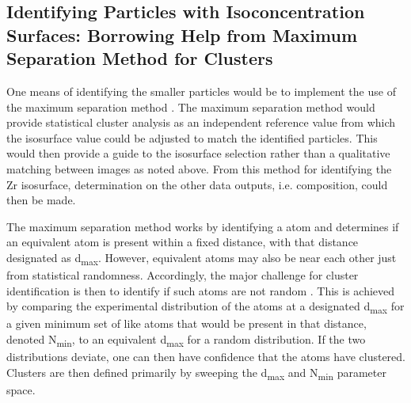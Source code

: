 	\subsection*{Identifying Particles with Isoconcentration Surfaces: Borrowing Help from Maximum Separation Method for Clusters}
	\label{Identifying Particles with Isoconcentration Surfaces: Borrowing Help from Maximum Separation Method for Clusters}

		One means of identifying the smaller particles would be to implement the use of the maximum separation method \cite{RN2642}. The maximum separation method would provide statistical cluster analysis as an independent reference value from which the isosurface value could be adjusted to match the identified particles. This would then provide a guide to the isosurface selection rather than a qualitative matching between images as noted above. From this method for identifying the Zr isosurface, determination on the other data outputs, i.e. composition, could then be made. 
		
		The maximum separation method works by identifying a atom and determines if an equivalent atom is present within a fixed distance, with that distance designated as d\textsubscript{max}. However, equivalent atoms may also be near each other just from statistical randomness. Accordingly, the major challenge for cluster identification is then to identify if such atoms are not random \cite{RN2674,RN2628}. This is achieved by comparing the experimental distribution of the atoms at a designated d\textsubscript{max} for a given minimum set of like atoms that would be present in that distance, denoted N\textsubscript{min}, to an equivalent d\textsubscript{max} for a random distribution. If the two distributions deviate, one can then have confidence that the atoms have clustered. Clusters are then defined primarily by sweeping the d\textsubscript{max} \cite{RN2633,RN1686,RN2620} and N\textsubscript{min} \cite{RN807} parameter space. 
		

